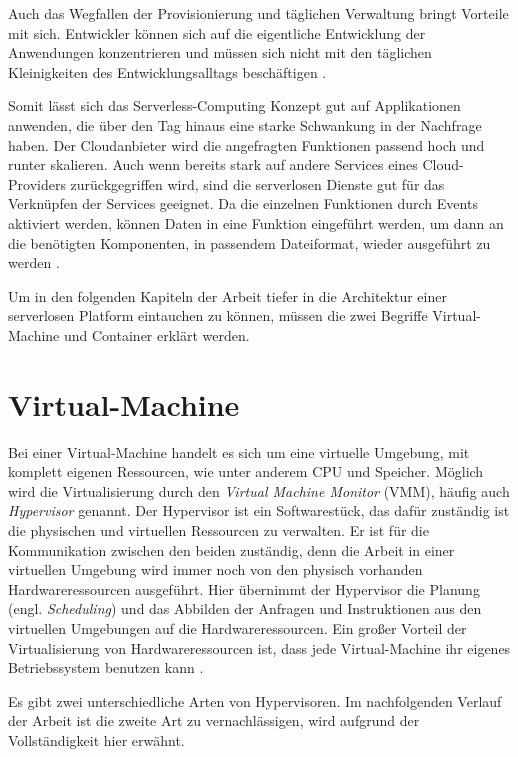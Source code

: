 Auch das Wegfallen der Provisionierung und täglichen Verwaltung bringt Vorteile mit sich.
Entwickler können sich auf die eigentliche Entwicklung der Anwendungen konzentrieren und
müssen sich nicht mit den täglichen Kleinigkeiten des Entwicklungsalltags
beschäftigen \cite{ServerlessTrends}.

Somit lässt sich das Serverless-Computing Konzept gut auf Applikationen anwenden,
die über den Tag hinaus eine starke Schwankung in der Nachfrage haben. Der Cloudanbieter wird
die angefragten Funktionen passend hoch und runter skalieren. Auch wenn bereits stark auf 
andere Services eines Cloud-Providers zurückgegriffen wird, sind die serverlosen Dienste
gut für das Verknüpfen der Services geeignet. Da die einzelnen Funktionen durch Events
aktiviert werden, können Daten in eine Funktion eingeführt werden, um
dann an die benötigten Komponenten, in passendem Dateiformat, wieder ausgeführt zu werden
\cite{ServerlessTrends} \cite{HpcServerless}.

Um in den folgenden Kapiteln der Arbeit tiefer in die Architektur einer serverlosen Platform
eintauchen zu können, müssen die zwei Begriffe Virtual-Machine und Container erklärt werden.

\section{Virtual-Machine}
Bei einer Virtual-Machine handelt es sich um eine virtuelle Umgebung, mit komplett 
eigenen Ressourcen, wie unter anderem CPU und Speicher.
Möglich wird die Virtualisierung durch den \textit{Virtual Machine Monitor} (VMM),
häufig auch \textit{Hypervisor} genannt.
Der Hypervisor ist ein Softwarestück, das dafür zuständig ist die physischen
und virtuellen Ressourcen zu verwalten. Er ist für die Kommunikation
zwischen den beiden zuständig, denn die Arbeit in einer
virtuellen Umgebung wird immer noch von den physisch vorhanden Hardwareressourcen ausgeführt.
Hier übernimmt der Hypervisor die Planung (engl. \textit{Scheduling}) und das Abbilden
der Anfragen und Instruktionen aus den virtuellen Umgebungen auf die Hardwareressourcen.
Ein großer Vorteil der Virtualisierung von Hardwareressourcen ist,
dass jede Virtual-Machine ihr eigenes Betriebssystem benutzen kann
\cite{RedHatVM} \cite{RedHatHypervisor}.

Es gibt zwei unterschiedliche Arten von Hypervisoren. Im nachfolgenden Verlauf der Arbeit
ist die zweite Art zu vernachlässigen, wird aufgrund der Vollständigkeit hier erwähnt.

